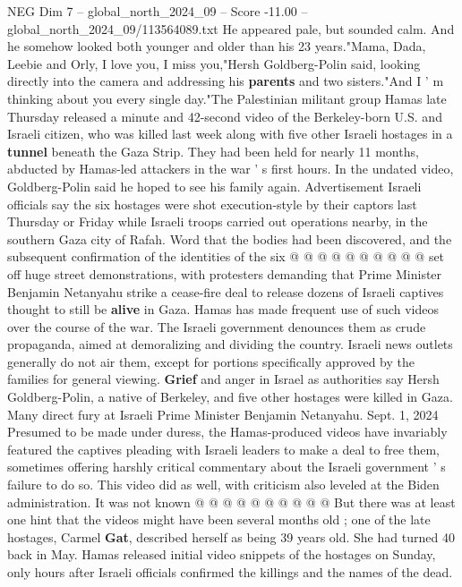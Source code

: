 \begin{textsample}{NEG Dim 7 – global\_north\_2024\_09 – Score -11.00 – global\_north\_2024\_09/113564089.txt}  \label{ex:f7_neg_010}
He appeared pale, but sounded calm.
And he somehow looked both younger and older than his 23 years."Mama, Dada, Leebie and Orly, I love you, I miss you,"Hersh Goldberg-Polin said, looking directly into the camera and addressing his \textbf{parents} and two sisters."And I ' m thinking about you every single day."The Palestinian militant group Hamas late Thursday released a minute and 42-second video of the Berkeley-born U.S. and Israeli citizen, who was killed last week along with five other Israeli hostages in a \textbf{tunnel} beneath the Gaza Strip.
They had been held for nearly 11 months, abducted by Hamas-led attackers in the war ' s first hours.
In the undated video, Goldberg-Polin said he hoped to see his family again.
Advertisement Israeli officials say the six hostages were shot execution-style by their captors last Thursday or Friday while Israeli troops carried out operations nearby, in the southern Gaza city of Rafah.
Word that the bodies had been discovered, and the subsequent confirmation of the identities of the six @ @ @ @ @ @ @ @ @ @ set off huge street demonstrations, with protesters demanding that Prime Minister Benjamin Netanyahu strike a cease-fire deal to release dozens of Israeli captives thought to still be \textbf{alive} in Gaza.
Hamas has made frequent use of such videos over the course of the war.
The Israeli government denounces them as crude propaganda, aimed at demoralizing and dividing the country.
Israeli news outlets generally do not air them, except for portions specifically approved by the families for general viewing. \textbf{Grief} and anger in Israel as authorities say Hersh Goldberg-Polin, a native of Berkeley, and five other hostages were killed in Gaza.
Many direct fury at Israeli Prime Minister Benjamin Netanyahu.
Sept. 1, 2024 Presumed to be made under duress, the Hamas-produced videos have invariably featured the captives pleading with Israeli leaders to make a deal to free them, sometimes offering harshly critical commentary about the Israeli government ' s failure to do so.
This video did as well, with criticism also leveled at the Biden administration.
It was not known @ @ @ @ @ @ @ @ @ @ But there was at least one hint that the videos might have been several months old ; one of the late hostages, Carmel \textbf{Gat}, described herself as being 39 years old.
She had turned 40 back in May.
Hamas released initial video snippets of the hostages on Sunday, only hours after Israeli officials confirmed the killings and the names of the dead.

\end{textsample}
